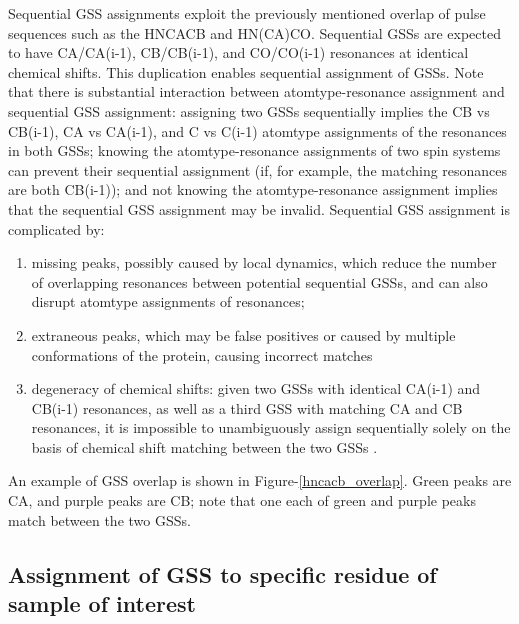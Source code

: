 Sequential GSS assignments exploit the previously mentioned overlap of pulse
sequences such as the HNCACB and HN(CA)CO.  Sequential GSSs 
are expected to have CA/CA(i-1), CB/CB(i-1), and CO/CO(i-1) resonances at 
identical chemical shifts.  This duplication enables sequential assignment 
of GSSs.  Note that there is substantial interaction between atomtype-resonance 
assignment and sequential GSS assignment: assigning two GSSs sequentially 
implies the CB vs CB(i-1), CA vs CA(i-1), and C vs C(i-1) atomtype assignments 
of the resonances in both GSSs; knowing the atomtype-resonance assignments of 
two spin systems can prevent their sequential assignment (if, for example, the 
matching resonances are both CB(i-1)); and not knowing the atomtype-resonance 
assignment implies that the sequential GSS assignment may be invalid.  
Sequential GSS assignment is complicated by: 
\begin{enumerate}
  \item missing peaks, possibly caused 
  by local dynamics, which reduce the number of overlapping resonances between 
  potential sequential GSSs, and can also disrupt atomtype assignments of 
  resonances; 
  \item extraneous peaks, which may be false positives or caused by 
  multiple conformations of the protein, causing incorrect matches
  \item degeneracy of chemical shifts:  given two GSSs with identical CA(i-1) 
  and CB(i-1) resonances, as well as a third GSS with matching CA and CB 
  resonances, it is impossible to unambiguously assign sequentially solely 
  on the basis of chemical shift matching between the two GSSs 
  \cite{autoassign1997}.
\end{enumerate}

An example of GSS overlap is shown in Figure-\ref{hncacb_overlap}.  Green peaks
are CA, and purple peaks are CB; note that one each of green and purple peaks
match between the two GSSs.

\subsection{Assignment of GSS to specific residue of sample of interest}

